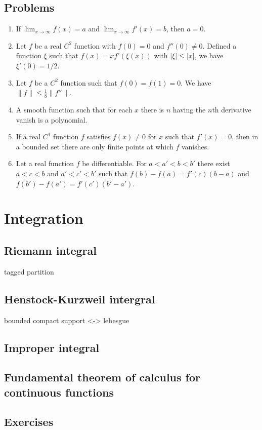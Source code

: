 \documentclass{../../large}
\begin{document}
\section*{Problems}
\begin{enumerate}
\item If $\lim_{x\to\infty}f(x)=a$ and $\lim_{x\to\infty}f'(x)=b$, then $a=0$.
\item Let $f$ be a real $C^2$ function with $f(0)=0$ and $f''(0)\ne0$.
Defined a function $\xi$ such that $f(x)=xf'(\xi(x))$ with $|\xi|\le|x|$, we have $\xi'(0)=1/2$.
\item Let $f$ be a $C^2$ function such that $f(0)=f(1)=0$.
We have $\|f\|\le\frac18\|f''\|$.
\item A smooth function such that for each $x$ there is $n$ having the $n$th derivative vanish is a polynomial.
\item If a real $C^1$ function $f$ satisfies $f(x)\ne0$ for $x$ such that $f'(x)=0$, then in a bounded set there are only finite points at which $f$ vanishes.
\item Let a real function $f$ be differentiable.
For $a<a'<b<b'$ there exist $a<c<b$ and $a'<c'<b'$ such that $f(b)-f(a)=f'(c)(b-a)$ and $f(b')-f(a')=f'(c')(b'-a')$.
\end{enumerate}






\chapter{Integration}

\section{Riemann integral}
tagged partition
\section{Henstock-Kurzweil intergral}
bounded compact support <-> lebesgue
\section{Improper integral}
\section{Fundamental theorem of calculus for continuous functions}

\section*{Exercises}
\end{document}
